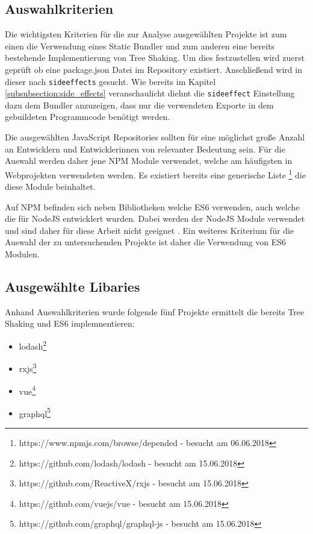 \subsection{Auswahlkriterien}
Die wichtigsten Kriterien für die zur Analyse ausgewählten Projekte ist zum einen die Verwendung eines Static Bundler und zum anderen eine bereits bestehende Implementierung von Tree Shaking. Um dies festzustellen wird zuerst geprüft ob eine package.json Datei im Repository existiert. Anschließend wird in dieser nach \lstinline{sideeffects} gesucht. Wie bereits im Kapitel \ref{subsubsection:side_effects} veranschaulicht diehnt die \lstinline{sideeffect} Einstellung dazu dem Bundler anzuzeigen, dass nur die verwendeten Exporte in dem gebuildeten Programmcode benötigt werden.

Die ausgewählten JavaScript Repositories sollten  für eine möglichst große Anzahl an Entwicklern und Entwicklerinnen von relevanter Bedeutung sein. Für die Auswahl werden daher jene NPM Module verwendet, welche am häufigsten in Webprojekten verwendeten werden. Es existiert bereits eine generische Liste \footnote{https://www.npmjs.com/browse/depended - besucht am 06.06.2018} die diese Module beinhaltet.

Auf NPM befinden sich neben Bibliotheken welche ES6 verwenden, auch welche die für NodeJS entwicklert wurden. Dabei werden der NodeJS Module verwendet und sind daher für diese Arbeit nicht geeignet \autocite{NodeJSModules}. Ein weiteres Kriterium für die Auswahl der zu untersuchenden Projekte ist daher die Verwendung von ES6 Modulen.


\subsection{Ausgewählte Libaries}
Anhand Auswahlkriterien wurde folgende fünf Projekte ermittelt die bereits Tree Shaking und ES6  implemnentieren:

\begin{itemize}
	\item{lodash\footnote{https://github.com/lodash/lodash - besucht am 15.06.2018}}
	\item{rxjs\footnote{https://github.com/ReactiveX/rxjs - besucht am 15.06.2018}}
	\item{vue\footnote{https://github.com/vuejs/vue - besucht am 15.06.2018}}
	\item{graphql\footnote{https://github.com/graphql/graphql-js - besucht am 15.06.2018}}
\end{itemize}

